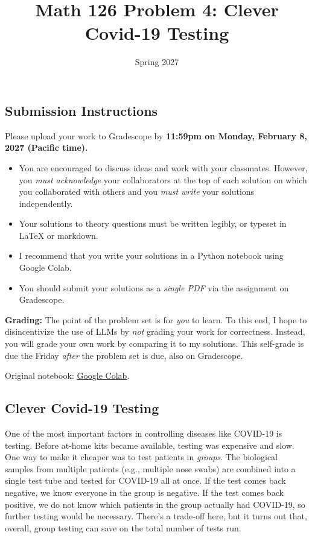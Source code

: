 \documentclass{article}
\title{Math 126 Problem 4: Clever Covid-19 Testing}
\author{} %
\date{Spring 2027}
\begin{document}
\maketitle

\hypertarget{submission-instructions}{%
\subsection*{Submission Instructions}\label{submission-instructions}}

Please upload your work to Gradescope by \textbf{11:59pm on Monday, February 8, 2027 (Pacific time).}

\begin{itemize}
\item
  You are encouraged to discuss ideas and work with your classmates. However, you \emph{must acknowledge} your collaborators at the top of each solution on which you collaborated with others and you \emph{must write} your solutions independently.
\item
  Your solutions to theory questions must be written legibly, or typeset in LaTeX or markdown.
\item
  I recommend that you write your solutions in a Python notebook using Google Colab.
\item
  You should submit your solutions as a \emph{single PDF} via the assignment on Gradescope.
\end{itemize}

\textbf{Grading:} The point of the problem set is for \emph{you} to learn. To this end, I hope to disincentivize the use of LLMs by \emph{not} grading your work for correctness. Instead, you will grade your own work by comparing it to my solutions. This self-grade is due the Friday \emph{after} the problem set is due, also on Gradescope.

\noindent Original notebook: \href{https://colab.research.google.com/drive/15L8Zi3LBvVXGeJOSaEmQKpPSaBQnjleI?usp=sharing}{Google Colab}.

\hypertarget{clever-covid-19-testing}{%
\subsection*{Clever Covid-19 Testing}\label{clever-covid-19-testing}}

One of the most important factors in controlling diseases like COVID-19 is testing. Before at-home kits became available, testing was expensive and slow. One way to make it cheaper was to test patients in \emph{groups}. The biological samples from multiple patients (e.g., multiple nose swabs) are combined into a single test tube and tested for COVID-19 all at once. If the test comes back negative, we know everyone in the group is negative. If the test comes back positive, we do not know which patients in the group actually had COVID-19, so further testing would be necessary. There's a trade-off here, but it turns out that, overall, group testing can save on the total number of tests run.
\end{document}
